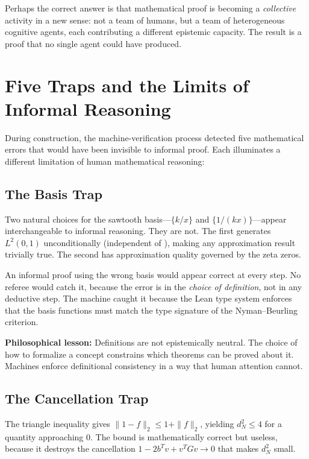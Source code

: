 \documentclass[11pt,a4paper]{article}
\begin{document}
Perhaps the correct answer is that mathematical proof is becoming
a \emph{collective} activity in a new sense: not a team of humans,
but a team of heterogeneous cognitive agents, each contributing a
different epistemic capacity. The result is a proof that no single
agent could have produced.

\section{Five Traps and the Limits of Informal Reasoning}
\label{sec:traps}

During construction, the machine-verification process detected five
mathematical errors that would have been invisible to informal proof.
Each illuminates a different limitation of human mathematical
reasoning:

\subsection{The Basis Trap}

Two natural choices for the sawtooth basis---$\{k/x\}$ and
$\{1/(kx)\}$---appear interchangeable to informal reasoning.
They are not. The first generates $L^2(0,1)$ unconditionally
(independent of \RH), making any approximation result trivially
true. The second has approximation quality governed by the zeta zeros.

An informal proof using the wrong basis would appear correct at
every step. No referee would catch it, because the error is in the
\emph{choice of definition}, not in any deductive step. The machine
caught it because the Lean type system enforces that the basis
functions must match the type signature of the Nyman--Beurling
criterion.

\textbf{Philosophical lesson:} Definitions are not epistemically
neutral. The choice of how to formalize a concept constrains which
theorems can be proved about it. Machines enforce definitional
consistency in a way that human attention cannot.

\subsection{The Cancellation Trap}

The triangle inequality gives $\|1 - f\|_2 \leq 1 + \|f\|_2$,
yielding $d_N^2 \leq 4$ for a quantity approaching 0. The bound is
mathematically correct but useless, because it destroys the
cancellation $1 - 2b^Tv + v^TGv \to 0$ that makes $d_N^2$ small.
\end{document}

